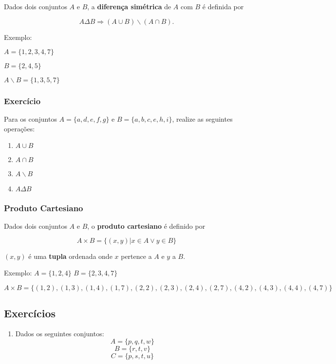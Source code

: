 Dados dois conjuntos \(A\) e \(B\), a \textbf{diferença simétrica} de
\(A\) com \(B\) é definida por

\[A\Delta B \Rightarrow (A \cup B) \backslash (A \cap B).\]

Exemplo:

\(A=\{1,2,3,4,7\}\)

\(B=\{2,4,5\}\)

\(A\backslash B = \{1,3,5,7\}\)

\subsubsection{Exercício}\label{exercuxedcio}

Para os conjuntos \(A = \{a, d, e, f, g\}\) e
\(B = \{a, b, c, e, h, i\}\), realize as seguintes operações:

\begin{enumerate}
\def\labelenumi{\alph{enumi}.}
\item
  \(A \cup B\)
\item
  \(A \cap B\)
\item
  \(A \backslash B\)
\item
  \(A \Delta B\)
\end{enumerate}

\subsubsection{Produto Cartesiano}\label{produto-cartesiano}

Dados dois conjuntos \(A\) e \(B\), o \textbf{produto cartesiano} é
definido por

\[A\times B = \{(x,y) | x \in A \lor y \in B\}\]

\((x,y)\) é uma \textbf{tupla} ordenada onde \(x\) pertence a \(A\) e
\(y\) a \(B\).

Exemplo: \(A=\{1,2,4\}\) \(B=\{2,3,4,7\}\)

\(A\times B = \{(1,2),(1,3),(1,4),(1,7),(2,2),(2,3),(2,4),(2,7),(4,2),(4,3),(4,4),(4,7)\}\)

\subsection{Exercícios}\label{exercuxedcios}

\begin{enumerate}
\def\labelenumi{\arabic{enumi}.}
\item
  Dados os seguintes conjuntos: \[A=\{p,q,t,w\}\] \[ B = \{r,t,v\}\]
  \[C=\{p,s,t,u\}\]
\end{enumerate}

